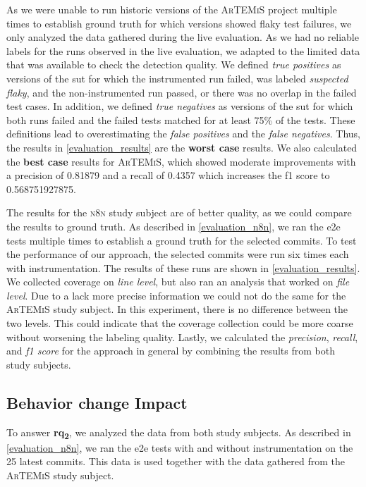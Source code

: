 As we were unable to run historic versions of the \textsc{ArTEMiS} project multiple times to establish ground truth for which versions showed flaky test failures, we only analyzed the data gathered during the live evaluation.
As we had no reliable labels for the runs observed in the live evaluation, we adapted to the limited data that was available to check the detection quality.
We defined \emph{true positives} as versions of the \ac{sut} for which the instrumented run failed, was labeled \emph{suspected flaky}, and the non-instrumented run passed, or there was no overlap in the failed test cases.
In addition, we defined \emph{true negatives} as versions of the \ac{sut} for which both runs failed and the failed tests matched for at least 75\% of the tests.
These definitions lead to overestimating the \emph{false positives} and the \emph{false negatives}.
Thus, the results in \cref{evaluation_results} are the \textbf{worst case} results.
We also calculated the \textbf{best case} results for \textsc{ArTEMiS}, which showed moderate improvements with a precision of \num{0.81879} and a recall of \num{0.4357} which increases the f1 score to \num{0.568751927875}.

The results for the \textsc{n8n} study subject are of better quality, as we could compare the results to ground truth.
As described in \cref{evaluation_n8n}, we ran the \ac{e2e} tests multiple times to establish a ground truth for the selected commits.
To test the performance of our approach, the selected commits were run six times each with instrumentation.
The results of these runs are shown in \cref{evaluation_results}.
We collected coverage on \textit{line level}, but also ran an analysis that worked on \textit{file level}.
Due to a lack more precise information we could not do the same for the \textsc{ArTEMiS} study subject.
In this experiment, there is no difference between the two levels.
This could indicate that the coverage collection could be more coarse without worsening the labeling quality.
Lastly, we calculated the \emph{precision}, \emph{recall}, and \emph{f1 score} for the approach in general by combining the results from both study subjects.

\subsection{Behavior change Impact}
To answer \textbf{\ac{rq}\textsubscript{2}}, we analyzed the data from both study subjects.
As described in \cref{evaluation_n8n}, we ran the \ac{e2e} tests with and without instrumentation on the 25 latest commits.
This data is used together with the data gathered from the \textsc{ArTEMiS} study subject.
